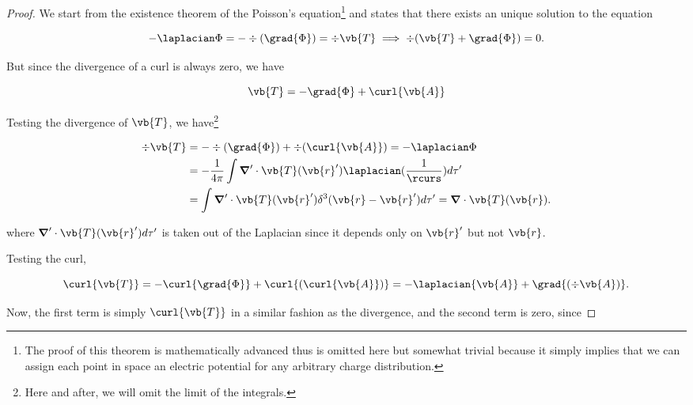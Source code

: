 \documentclass[english,a4paper,12pt]{report}
\begin{document}
\begin{proof}

We start from the existence theorem of the Poisson's equation\footnote{The proof of this theorem is mathematically advanced thus is omitted here but somewhat trivial because it simply implies that we can assign each point in space an electric potential for any arbitrary charge distribution.} and states that there exists an unique solution to the equation

\begin{equation}
	-\laplacian \Phi = - \div{(\grad{\Phi} )} = \div{\vb{T} } \implies \div{(\vb{T} + \grad{\Phi} )} = 0.
\end{equation}

But since the divergence of a curl is always zero, we have

\begin{equation}
	\vb{T} = - \grad{\Phi } + \curl{\vb{A} }
\end{equation}

Testing the divergence of \(\vb{T} \), we have\footnote{Here and after, we will omit the limit of the integrals.}

\begin{equation}
	\begin{aligned}
		\div{\vb{T} } &= -\div{(\grad{\Phi} )} + \div{(\curl{\vb{A} } )} = -\laplacian \Phi \\ 
		&= -\frac{1}{4\pi } \int \boldsymbol{\nabla}' \cdot \vb{T} (\vb{r} ') \laplacian (\frac{1}{\rcurs } ) d\tau ' \\ 
		&= \int \boldsymbol{\nabla}' \cdot \vb{T} (\vb{r} ') \delta ^3(\vb{r} -\vb{r} ')d\tau ' = \boldsymbol{\nabla} \cdot \vb{T} (\vb{r}). \label{divT}  
	\end{aligned}
\end{equation}

where \(\boldsymbol{\nabla}' \cdot \vb{T} (\vb{r} ') d\tau '\) is taken out of the Laplacian since it depends only on \(\vb{r} '\) but not \(\vb{r} \). 

Testing the curl,

\begin{equation}
	 \curl{\vb{T}} = -\curl{\grad{\Phi}} + \curl{(\curl{\vb{A}})} = -\laplacian{\vb{A}} + \grad{(\div{\vb{A}})}. \label{int1} 
\end{equation}

Now, the first term is simply \(\curl{\vb{T} }\) in a similar fashion as the divergence, and the second term is zero, since 


\end{proof}
\end{document}
